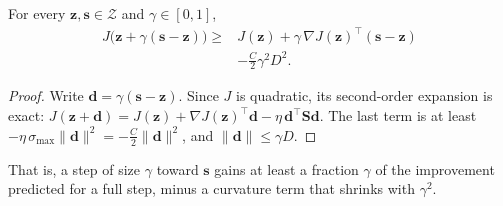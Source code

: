 \begin{lemma}
\label{lem:step}
For every $\mathbf z,\mathbf s\in\mathcal Z$ and $\gamma\in[0,1]$,
\begin{equation}
\begin{aligned}
  J\big(\mathbf z+\gamma(\mathbf s-\mathbf z)\big)\ge{}& J(\mathbf z)+\gamma\,\nabla J(\mathbf z)^{\top}(\mathbf s-\mathbf z)\\
  &-\frac{C}{2}\gamma^2D^2 .
\end{aligned}
\label{eq:supp-lem-step}
\end{equation}
\end{lemma}
\begin{proof}
Write $\mathbf d=\gamma(\mathbf s-\mathbf z)$. Since $J$ is quadratic, its second-order expansion is exact: $J(\mathbf z+\mathbf d)=J(\mathbf z)+\nabla J(\mathbf z)^{\top}\mathbf d-\eta\,\mathbf d^{\top}\mathbf S\mathbf d$. The last term is at least $-\eta\,\sigma_{\max}\|\mathbf d\|^2=-\frac{C}{2}\|\mathbf d\|^2$, and $\|\mathbf d\|\le\gamma D$.
\end{proof}

\noindent That is, a step of size $\gamma$ toward $\mathbf s$ gains at least a fraction $\gamma$ of the improvement predicted for a full step, minus a curvature term that shrinks with $\gamma^2$.

